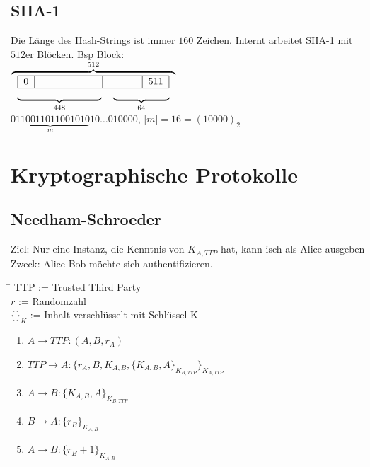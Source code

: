 \documentclass[10pt]{article}
\newcommand{\Abs}[1]{\left| #1 \right|} %
\begin{document}
\subsection{SHA-1}
Die Länge des Hash-Strings ist immer $160$ Zeichen. Internt arbeitet SHA-1 mit $512$er Blöcken. Bsp Block: \\
$\overbrace{
\begin{tabular}{cc}
 \multicolumn{2}{c}{\begin{tabular}{|c|c|l|c|}\hline
  0&\hspace*{2cm}&\hspace*{1cm}&511\\\hline
 \end{tabular}}\\
 $\underbrace{\hspace*{3cm}}_{448}$&$\underbrace{\hspace*{2cm}}_{64}$
\end{tabular}}^{512}$\\
$\underbrace{0110011011001010}_m10\dots010000$, $\Abs{m}=16=(10000)_2$\\

\newpage
\section{Kryptographische Protokolle}
\subsection{Needham-Schroeder}
Ziel: Nur eine Instanz, die Kenntnis von $K_{A,TTP}$ hat, kann isch als Alice ausgeben\\
Zweck: Alice Bob möchte sich authentifizieren.\\

\begin{tabbing}
\hspace{2em}\=\kill
TTP \> := Trusted Third Party\\
$r$ \> := Randomzahl\\
$\{\}_K$ \> := Inhalt verschlüsselt mit Schlüssel K\\
\end{tabbing} 

\begin{enumerate}
\item $A \rightarrow TTP: (A,B,r_A)$
\item $TTP \rightarrow A: \{r_A,B,K_{A,B},\{K_{A,B},A\}_{K_{B,TTP}}\}_{K_{A,TTP}}$
\item $A \rightarrow B: \{K_{A,B},A\}_{K_{B,TTP}}$
\item $B \rightarrow A: \{r_B\}_{K_{A,B}}$
\item $A \rightarrow B: \{r_B+1\}_{K_{A,B}}$
\end{enumerate}
\end{document}
